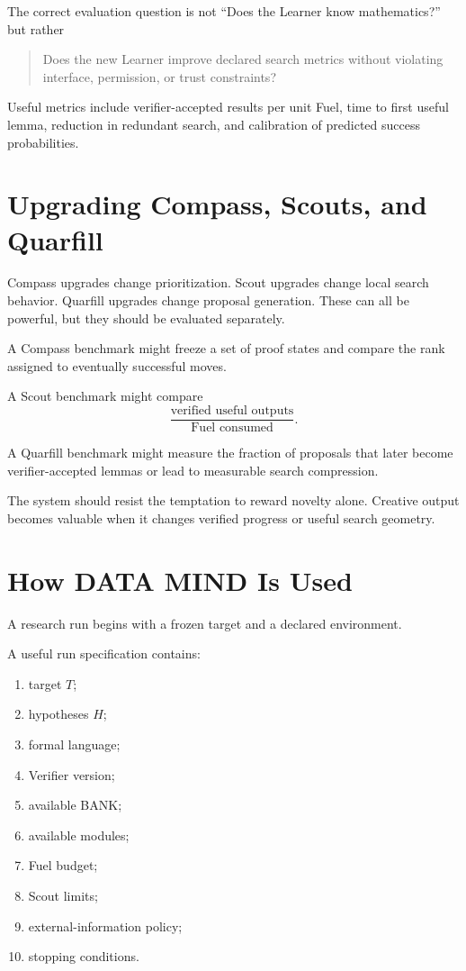 \documentclass[11pt]{article}
\begin{document}
The correct evaluation question is not ``Does the Learner know mathematics?'' but rather
\begin{quote}
Does the new Learner improve declared search metrics without violating interface, permission, or trust constraints?
\end{quote}

Useful metrics include verifier-accepted results per unit Fuel, time to first useful lemma, reduction in redundant search, and calibration of predicted success probabilities.

\section{Upgrading Compass, Scouts, and Quarfill}

Compass upgrades change prioritization. Scout upgrades change local search behavior. Quarfill upgrades change proposal generation. These can all be powerful, but they should be evaluated separately.

A Compass benchmark might freeze a set of proof states and compare the rank assigned to eventually successful moves.

A Scout benchmark might compare
\[
\frac{\text{verified useful outputs}}{\text{Fuel consumed}}.
\]

A Quarfill benchmark might measure the fraction of proposals that later become verifier-accepted lemmas or lead to measurable search compression.

The system should resist the temptation to reward novelty alone. Creative output becomes valuable when it changes verified progress or useful search geometry.

\section{How DATA MIND Is Used}

A research run begins with a frozen target and a declared environment.

A useful run specification contains:
\begin{enumerate}
\item target $T$;
\item hypotheses $H$;
\item formal language;
\item Verifier version;
\item available BANK;
\item available modules;
\item Fuel budget;
\item Scout limits;
\item external-information policy;
\item stopping conditions.
\end{enumerate}
\end{document}
